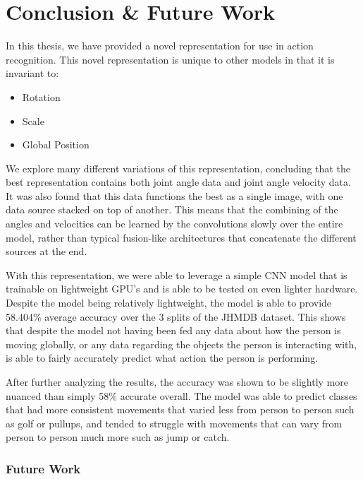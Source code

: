 
\chapter{Conclusion \& Future Work} %

\label{Conclusion}

In this thesis, we have provided a novel representation for use in action recognition. This novel representation is unique to other models in that it is invariant to:

\begin{itemize}
	\item Rotation
	\item Scale
	\item Global Position
\end{itemize}

We explore many different variations of this representation, concluding that the best representation contains both joint angle data and joint angle velocity data. It was also found that this data functions the best as a single image, with one data source stacked on top of another. This means that the combining of the angles and velocities can be learned by the convolutions slowly over the entire model, rather than typical fusion-like architectures that concatenate the different sources at the end.

With this representation, we were able to leverage a simple CNN model that is trainable on lightweight GPU's and is able to be tested on even lighter hardware. Despite the model being relatively lightweight, the model is able to provide 58.404\% average accuracy over the 3 splits of the JHMDB dataset. This shows that despite the model not having been fed any data about how the person is moving globally, or any data regarding the objects the person is interacting with, is able to fairly accurately predict what action the person is performing.

After further analyzing the results, the accuracy was shown to be slightly more nuanced than simply 58\% accurate overall. The model was able to predict classes that had more consistent movements that varied less from person to person such as golf or pullups, and tended to struggle with movements that can vary from person to person much more such as jump or catch.

\subsection{Future Work}